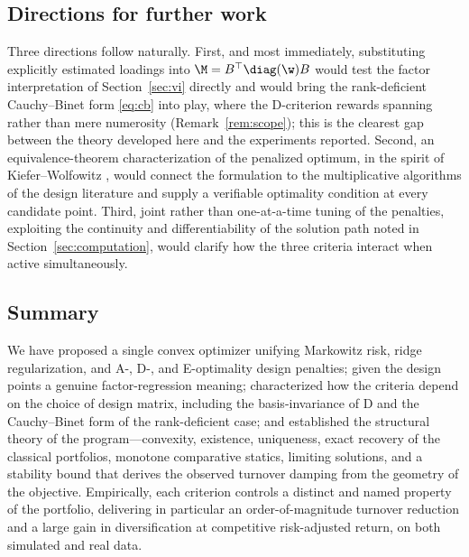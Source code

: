 \subsection{Directions for further work}
Three directions follow naturally. First, and most immediately, substituting
explicitly estimated loadings into $\M=B^\top\diag(\w)B$ would test the factor
interpretation of Section~\ref{sec:vi} directly and would bring the
rank-deficient Cauchy--Binet form \eqref{eq:cb} into play, where the D-criterion
rewards spanning rather than mere numerosity (Remark~\ref{rem:scope}); this is
the clearest gap between the theory developed here and the experiments reported.
Second, an equivalence-theorem characterization of the penalized optimum, in the
spirit of Kiefer--Wolfowitz \cite{kiefer1960}, would connect the formulation to
the multiplicative algorithms of the design literature and supply a verifiable
optimality condition at every candidate point. Third, joint rather than
one-at-a-time tuning of the penalties, exploiting the continuity and
differentiability of the solution path noted in Section~\ref{sec:computation},
would clarify how the three criteria interact when active simultaneously.

\subsection{Summary}
We have proposed a single convex optimizer unifying Markowitz risk, ridge
regularization, and A-, D-, and E-optimality design penalties; given the design
points a genuine factor-regression meaning; characterized how the criteria depend
on the choice of design matrix, including the basis-invariance of D and the
Cauchy--Binet form of the rank-deficient case; and established the structural
theory of the program---convexity, existence, uniqueness, exact recovery of the
classical portfolios, monotone comparative statics, limiting solutions, and a
stability bound that derives the observed turnover damping from the geometry of
the objective. Empirically, each criterion controls a distinct and named property
of the portfolio, delivering in particular an order-of-magnitude turnover
reduction and a large gain in diversification at competitive risk-adjusted
return, on both simulated and real data.
